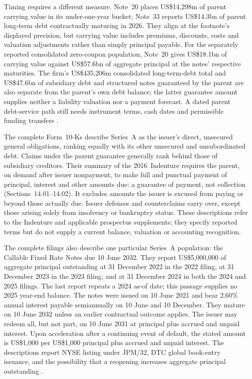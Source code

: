 Timing requires a different measure. Note~20 places US\$14{,}298m of parent
carrying value in its under-one-year bucket; Note~33 reports US\$14.3bn of
parent long-term debt contractually maturing in 2026. They align at the
footnote's displayed precision, but carrying value includes premiums,
discounts, costs and valuation adjustments rather than simply principal
payable. For the separately reported consolidated zero-coupon population,
Note~20 gives US\$18.1bn of carrying value against US\$57.6bn of aggregate
principal at the notes' respective maturities. The firm's US\$435{,}206m
consolidated long-term-debt total and US\$47.6bn of subsidiary debt and
structured notes guaranteed by the parent are also separate from the parent's
own debt balance; the latter guarantee amount supplies neither a liability
valuation nor a payment forecast. A dated parent debt-service path still needs
instrument terms, cash dates and permissible funding transfers
\citep[pp.~281--282, 310--311]{jpmorgan2025tenk}.

\newpage

The complete Form~10-Ks describe Series~A as the issuer's direct, unsecured
general obligations, ranking equally with its other unsecured and
unsubordinated debt. Claims under the parent guarantee generally rank behind
those of subsidiary creditors. Their summary of the 2016~Indenture requires
the parent, on demand after issuer nonpayment, to make full and punctual
payment of principal, interest and other amounts due: a guarantee of payment,
not collection
(Sections~14.01--14.02). It excludes amounts the issuer is excused from paying
or beyond those actually due. Issuer defenses and counterclaims carry over,
except those arising solely from insolvency or bankruptcy status. These
descriptions refer to the Indenture and applicable prospectus supplements;
they specify reported terms but do not supply a current balance, valuation or
accounting recognition.

The complete filings also describe one particular Series~A population: the
Callable Fixed Rate Notes due 10 June 2032. They report US\$5,000,000 of
aggregate principal outstanding at 31 December 2022 in the 2022 filing, at
31 December 2023 in the 2023 filing, and at 31 December 2024 in both the 2024
and 2025 filings. The last report repeats a 2024 as-of date; this passage
supplies no 2025 year-end balance. The notes were issued on 10 June 2021 and bear 2.60\%
annual interest payable semiannually on 10 June and 10 December. They mature
on 10 June 2032 unless an earlier contractual outcome applies. The issuer
may redeem all, but not part, on 10 June 2031 at principal plus accrued and
unpaid interest. Upon acceleration after a continuing event of default, the
stated amount is US\$1,000 per US\$1,000 principal plus accrued and unpaid
interest. The descriptions report NYSE listing under JPM/32, DTC global
book-entry issuance, and the possibility that a reopening increases aggregate
principal outstanding \citep{jpmorgan2022tenk,jpmorgan2023tenk,jpmorgan2024tenk,jpmorgan2025tenk}.

